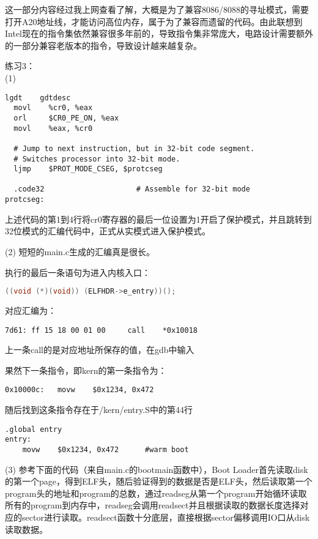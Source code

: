 \documentclass[a4paper, 11pt]{ctexart}
\begin{document}
这一部分内容经过我上网查看了解，大概是为了兼容8086/8088的寻址模式，需要打开A20地址线，才能访问高位内存，属于为了兼容而遗留的代码。由此联想到Intel现在的指令集依然兼容很多年前的，导致指令集非常庞大，电路设计需要额外的一部分兼容老版本的指令，导致设计越来越复杂。

\color{red}练习3：\color{black}\\
(1)
\begin{lstlisting}[language={[x86masm]Assembler}] 
  lgdt    gdtdesc
  movl    %cr0, %eax
  orl     $CR0_PE_ON, %eax
  movl    %eax, %cr0
  
  # Jump to next instruction, but in 32-bit code segment.
  # Switches processor into 32-bit mode.
  ljmp    $PROT_MODE_CSEG, $protcseg

  .code32                     # Assemble for 32-bit mode
protcseg:
\end{lstlisting}

上述代码的第1到4行将cr0寄存器的最后一位设置为1开启了保护模式，并且跳转到32位模式的汇编代码中，正式从实模式进入保护模式。

(2)
短短的main.c生成的汇编真是很长。

执行的最后一条语句为进入内核入口：
\begin{lstlisting}[language={C}] 
((void (*)(void)) (ELFHDR->e_entry))();
\end{lstlisting}

对应汇编为：
\begin{lstlisting}[language={[x86masm]Assembler}] 
7d61: ff 15 18 00 01 00		call	*0x10018
\end{lstlisting}

上一条call的是对应地址所保存的值，在gdb中输入\\

果然下一条指令，即kern的第一条指令为：
\begin{lstlisting}[language={[x86masm]Assembler}] 
0x10000c:	movw	$0x1234, 0x472
\end{lstlisting}

随后找到这条指令存在于/kern/entry.S中的第44行
\begin{lstlisting}[language={[x86masm]Assembler}] 
.global entry
entry:
	movw	$0x1234, 0x472		#warm boot
\end{lstlisting}

(3)
参考下面的代码（来自main.c的bootmain函数中），Boot Loader首先读取disk的第一个page，得到ELF头，随后验证得到的数据是否是ELF头，然后读取第一个program头的地址和program的总数，通过readseg从第一个program开始循环读取所有的program到内存中，readseg会调用readsect并且根据读取的数据长度选择对应的sector进行读取。readsect函数十分底层，直接根据sector偏移调用IO口从disk读取数据。
\end{document}
